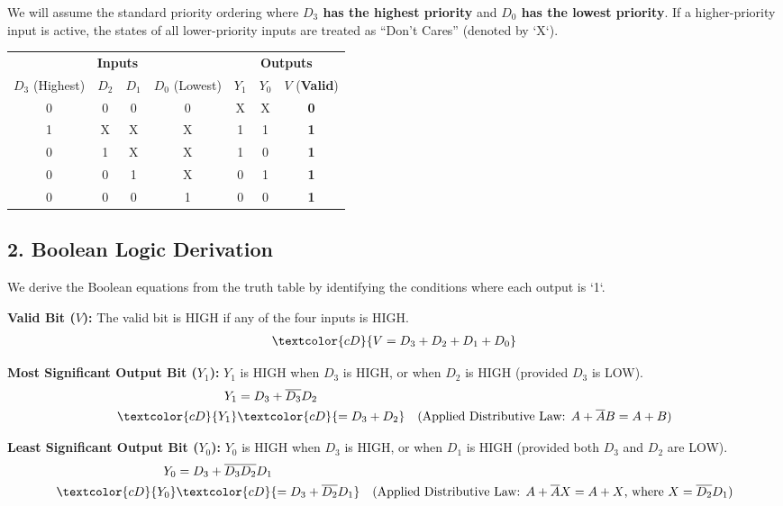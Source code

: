 \documentclass[12pt,a3paper]{article}
\begin{document}
\begin{enumerate}
\begin{tcolorbox}[enhanced,breakable,ansbox,colback=cD!4,colframe=cD,boxrule=0.8pt,arc=5pt,title={\textbf{Answer}},fonttitle=\bfseries\color{white},colbacktitle=cD]
We will assume the standard priority ordering where \textbf{$D_3$ has the highest priority} and \textbf{$D_0$ has the lowest priority}. If a higher-priority input is active, the states of all lower-priority inputs are treated as ``Don't Cares'' (denoted by `X`).

\begin{center}
\renewcommand{\arraystretch}{1.2}
\begin{tabular}{cccc|ccc}
\toprule
\multicolumn{4}{c|}{\textbf{Inputs}} & \multicolumn{3}{c}{\textbf{Outputs}} \\
$D_3$ (Highest) & $D_2$ & $D_1$ & $D_0$ (Lowest) & $Y_1$ & $Y_0$ & $V$ (\textbf{Valid}) \\
\midrule
0 & 0 & 0 & 0 & X & X & \textcolor{cD}{\textbf{0}} \\
1 & X & X & X & 1 & 1 & \textcolor{cD}{\textbf{1}} \\
0 & 1 & X & X & 1 & 0 & \textcolor{cD}{\textbf{1}} \\
0 & 0 & 1 & X & 0 & 1 & \textcolor{cD}{\textbf{1}} \\
0 & 0 & 0 & 1 & 0 & 0 & \textcolor{cD}{\textbf{1}} \\
\bottomrule
\end{tabular}
\end{center}

\subsection*{2. Boolean Logic Derivation}

We derive the Boolean equations from the truth table by identifying the conditions where each output is `1`.

\textbf{Valid Bit ($V$):}
The valid bit is HIGH if any of the four inputs is HIGH.
\begin{align*}
    \textcolor{cD}{V = D_3 + D_2 + D_1 + D_0}
\end{align*}

\textbf{Most Significant Output Bit ($Y_1$):}
$Y_1$ is HIGH when $D_3$ is HIGH, or when $D_2$ is HIGH (provided $D_3$ is LOW).
\begin{align*}
    Y_1 &= D_3 + \overline{D_3}D_2 \\
    \textcolor{cD}{Y_1} &\textcolor{cD}{= D_3 + D_2} \quad \text{(Applied Distributive Law: $A + \overline{A}B = A + B$)}
\end{align*}

\textbf{Least Significant Output Bit ($Y_0$):}
$Y_0$ is HIGH when $D_3$ is HIGH, or when $D_1$ is HIGH (provided both $D_3$ and $D_2$ are LOW).
\begin{align*}
    Y_0 &= D_3 + \overline{D_3}\overline{D_2}D_1 \\
    \textcolor{cD}{Y_0} &\textcolor{cD}{= D_3 + \overline{D_2}D_1} \quad \text{(Applied Distributive Law: $A + \overline{A}X = A + X$, where $X = \overline{D_2}D_1$)}
\end{align*}


\end{tcolorbox}
\end{enumerate}
\end{document}

